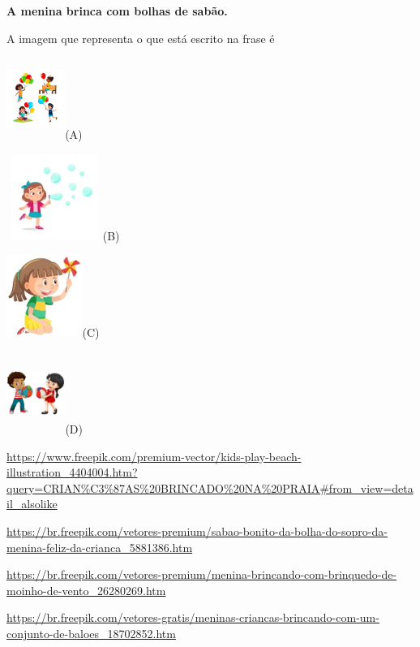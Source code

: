 {{\textbf{A menina brinca com bolhas de sabão.}

A imagem que representa o que está escrito na frase é

\includegraphics[width=0.75159in,height=1.04531in]{media/image78.jpeg}(A)

\includegraphics[width=1.23681in,height=1.10139in]{media/image79.jpeg}(B)

\includegraphics[width=0.97361in,height=1.05069in]{media/image80.jpeg}(C)

\includegraphics[width=0.75437in,height=1.04404in]{media/image81.jpeg}(D)

\url{https://www.freepik.com/premium-vector/kids-play-beach-illustration_4404004.htm?query=CRIAN\%C3\%87AS\%20BRINCADO\%20NA\%20PRAIA\#from_view=detail_alsolike}

\url{https://br.freepik.com/vetores-premium/sabao-bonito-da-bolha-do-sopro-da-menina-feliz-da-crianca_5881386.htm}

\url{https://br.freepik.com/vetores-premium/menina-brincando-com-brinquedo-de-moinho-de-vento_26280269.htm}

\url{https://br.freepik.com/vetores-gratis/meninas-criancas-brincando-com-um-conjunto-de-baloes_18702852.htm}

}}
